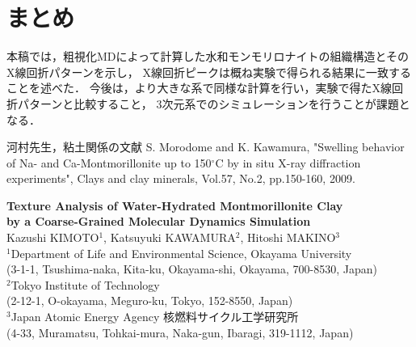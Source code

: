 ﻿\documentclass[11pt,a4j]{jarticle}
\begin{document}
\section{まとめ}
本稿では，粗視化MDによって計算した水和モンモリロナイトの組織構造とそのX線回折パターンを示し，
X線回折ピークは概ね実験で得られる結果に一致することを述べた．
今後は，より大きな系で同様な計算を行い，実験で得たX線回折パターンと比較すること，
3次元系でのシミュレーションを行うことが課題となる．
\begin{thebibliography}{99}
	河村先生，粘土関係の文献
	S. Morodome and K. Kawamura, "Swelling behavior of Na- and Ca-Montmorillonite
	up to 150$^\circ$C by in situ X-ray diffraction experiments", 
	Clays and clay minerals, Vol.57, No.2, pp.150-160, 2009.
\end{thebibliography}
\clearpage
\begin{center}
{\large \bf
Texture Analysis of Water-Hydrated Montmorillonite Clay\\ 
by a Coarse-Grained Molecular Dynamics Simulation
}
\\ \vspace{5mm}
Kazushi KIMOTO$^1$, Katsuyuki KAWAMURA$^2$, Hitoshi MAKINO$^3$\\
\vspace{5mm}
$^1$Department of Life and Environmental Science, Okayama University\\
(3-1-1, Tsushima-naka, Kita-ku, Okayama-shi, Okayama, 700-8530, Japan)
\\
$^2$Tokyo Institute of Technology\\ (2-12-1, O-okayama, Meguro-ku, Tokyo, 152-8550, Japan)\\
$^3$Japan Atomic Energy Agency 核燃料サイクル工学研究所\\
(4-33, Muramatsu, Tohkai-mura, Naka-gun, Ibaragi, 319-1112, Japan)
\end{center}
\end{document}
